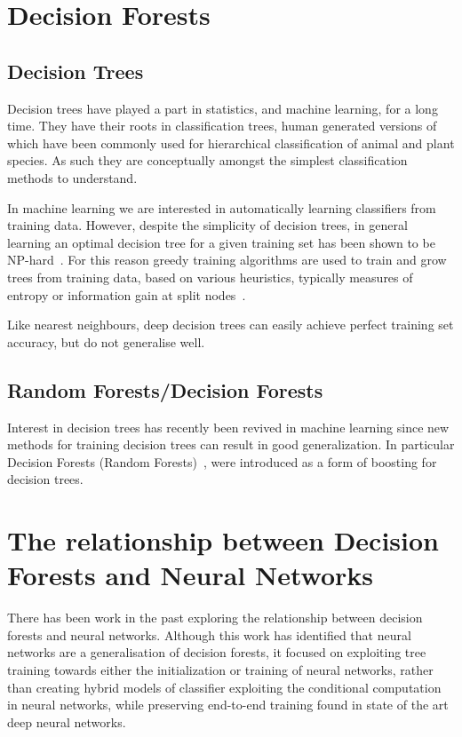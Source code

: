 \documentclass[thesis]{subfiles}
\begin{document}
\section{Decision Forests}
\subsection{Decision Trees}
Decision trees have played a part in statistics, and machine learning, for a long time. They have their roots in classification trees, human generated versions of which have been commonly used for hierarchical classification of animal and plant species. As such they are conceptually amongst the simplest classification methods to understand. 

In machine learning we are interested in automatically learning classifiers from training data. However, despite the simplicity of decision trees, in general learning an optimal decision tree for a given training set has been shown to be NP-hard~\cite{journals/iandc/HancockJLT96}. For this reason greedy training algorithms are used to train and grow trees from training data, based on various heuristics, typically measures of entropy or information gain at split nodes~\cite{breiman84}. 

Like nearest neighbours, deep decision trees can easily achieve perfect training set accuracy, but do not generalise well. 

\subsection{Random Forests/Decision Forests}
Interest in decision trees has recently been revived in machine learning since new methods for training decision trees can result in good generalization. In particular Decision Forests (Random Forests)~\cite{journals/neco/AmitG97,breiman2001random}, were introduced as a form of boosting for decision trees.

\section{The relationship between Decision Forests and Neural Networks}
There has been work in the past exploring the relationship between decision forests and neural networks. Although this work has identified that neural networks are a generalisation of decision forests, it focused on exploiting tree training towards either the initialization or training of neural networks, rather than creating hybrid models of classifier exploiting the conditional computation in neural networks, while preserving end-to-end training found in state of the art deep neural networks.
\end{document}
